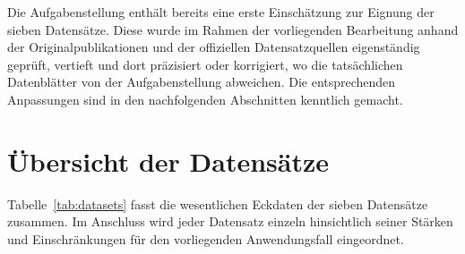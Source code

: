 \documentclass[11pt,a4paper,oneside]{report}
\begin{document}
Die Aufgabenstellung enthält bereits eine erste Einschätzung zur Eignung der
sieben Datensätze. Diese wurde im Rahmen der vorliegenden Bearbeitung anhand
der Originalpublikationen und der offiziellen Datensatzquellen eigenständig
geprüft, vertieft und dort präzisiert oder korrigiert, wo die tatsächlichen
Datenblätter von der Aufgabenstellung abweichen. Die entsprechenden
Anpassungen sind in den nachfolgenden Abschnitten kenntlich gemacht.

\section{Übersicht der Datensätze}
\label{sec:dataset_overview}

Tabelle~\ref{tab:datasets} fasst die wesentlichen Eckdaten der sieben
Datensätze zusammen. Im Anschluss wird jeder Datensatz einzeln hinsichtlich
seiner Stärken und Einschränkungen für den vorliegenden Anwendungsfall
eingeordnet.
\end{document}
